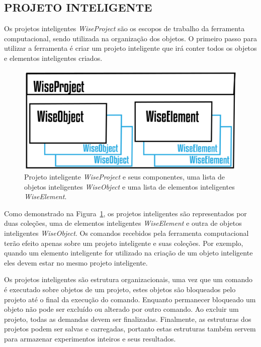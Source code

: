 \subsection{PROJETO INTELIGENTE}\label{sec:projeto}

Os projetos inteligentes \textit{WiseProject} são os escopos de trabalho da ferramenta computacional, sendo utilizada na organização dos objetos. O primeiro passo para utilizar a ferramenta é criar um projeto inteligente que irá conter todos os objetos e elementos inteligentes criados.


\begin{figure}[!htbp]
	\centering
	\includegraphics[scale=2]{Figures/WiseProject@16x.png}
	\caption{Projeto inteligente \textit{WiseProject} e seus componentes, uma lista de objetos inteligentes \textit{WiseObject} e uma lista de elementos inteligentes \textit{WiseElement}.}
	\label{fig7:project}
\end{figure}

Como demonstrado na Figura~\ref{fig7:project}, os projetos inteligentes são representados por duas coleções, uma de elementos inteligentes \textit{WiseElement} e outra de objetos inteligentes \textit{WiseObject}. Os comandos recebidos pela ferramenta computacional terão efeito apenas sobre um projeto inteligente e suas coleções. Por exemplo, quando um elemento inteligente for utilizado na criação de um objeto inteligente eles devem estar no mesmo projeto inteligente.

Os projetos inteligentes são estrutura organizacionais, uma vez que um comando é executado sobre objetos de um projeto, estes objetos são bloqueados pelo projeto até o final da execução do comando. Enquanto permanecer bloqueado um objeto não pode ser excluído ou alterado por outro comando. Ao excluir um projeto, todas as demandas devem ser finalizadas. Finalmente, as estruturas dos projetos podem ser salvas e carregadas, portanto estas estruturas também servem para armazenar experimentos inteiros e seus resultados.

